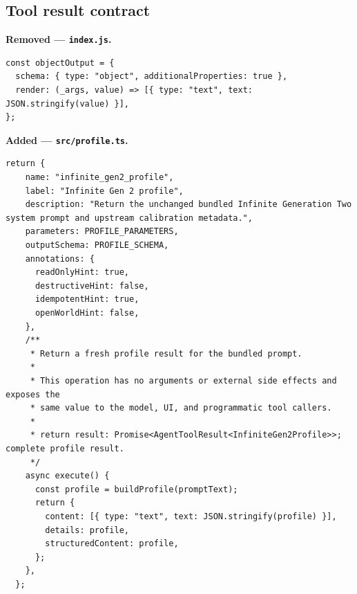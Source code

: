 \documentclass[10pt]{ltjsarticle}
\begin{document}
\subsection{Tool result contract}
\noindent\textbf{Removed --- \texttt{index.js}.}\par\smallskip
\begin{lstlisting}[backgroundcolor=\color{RemovedBg},firstnumber=6]
const objectOutput = {
  schema: { type: "object", additionalProperties: true },
  render: (_args, value) => [{ type: "text", text: JSON.stringify(value) }],
};
\end{lstlisting}
\noindent\textbf{Added --- \texttt{src/profile.ts}.}\par\smallskip
\begin{lstlisting}[backgroundcolor=\color{AddedBg},firstnumber=95]
  return {
    name: "infinite_gen2_profile",
    label: "Infinite Gen 2 profile",
    description: "Return the unchanged bundled Infinite Generation Two system prompt and upstream calibration metadata.",
    parameters: PROFILE_PARAMETERS,
    outputSchema: PROFILE_SCHEMA,
    annotations: {
      readOnlyHint: true,
      destructiveHint: false,
      idempotentHint: true,
      openWorldHint: false,
    },
    /**
     * Return a fresh profile result for the bundled prompt.
     *
     * This operation has no arguments or external side effects and exposes the
     * same value to the model, UI, and programmatic tool callers.
     *
     * return result: Promise<AgentToolResult<InfiniteGen2Profile>>; complete profile result.
     */
    async execute() {
      const profile = buildProfile(promptText);
      return {
        content: [{ type: "text", text: JSON.stringify(profile) }],
        details: profile,
        structuredContent: profile,
      };
    },
  };
\end{lstlisting}
\end{document}
